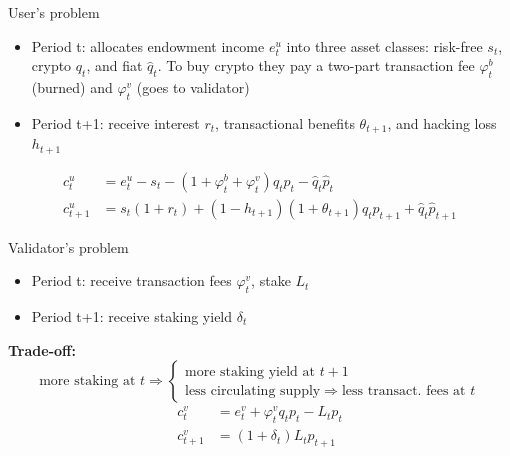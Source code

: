 \documentclass{beamer}
\begin{document}
\begin{frame}{User's problem}
    \begin{itemize}
    \item Period t: allocates endowment income $e_t^u$ into three asset classes: risk-free $s_t$, crypto $q_t$, and fiat $\hat{q}_t$. To buy crypto they pay a two-part transaction fee $\varphi_t^b$ (burned) and $\varphi_t^v$ (goes to validator)\\
    \item Period t+1: receive interest $r_t$, transactional benefits $\theta_{t+1}$, and hacking loss $h_{t+1}$\\
    \end{itemize}

    \begin{align}
    c_t^u &= e_t^u - s_t - (1+ \varphi_t^b+\varphi_t^v) q_t p_t - \hat{q}_t \hat{p}_t\\
    c_{t+1}^u &=  s_t (1+r_t) + (1-h_{t+1})(1+\theta_{t+1}) q_t p_{t+1} + \hat{q}_t \hat{p}_{t+1}
    \end{align}


\end{frame}


\begin{frame}{Validator's problem}
    \begin{itemize}
        \item Period t: receive transaction fees $\varphi_t^v$, stake $L_t$
        \item Period t+1: receive staking yield $\delta_t$
    \end{itemize}
    \textbf{Trade-off:}
    \[
    \text{more staking at } t \Rightarrow
    \begin{cases}
        \text{more staking yield at } t+1\\
        \text{less circulating supply} \Rightarrow \text{less transact. fees at } t
    \end{cases}
    \]
    \begin{align}
    c_t^v &= e_t^v + \varphi_t^v q_t p_t - L_t p_t \\
    c_{t+1}^v &= (1+\delta_t) L_t p_{t+1} 
    \end{align}
\end{frame}
\end{document}
